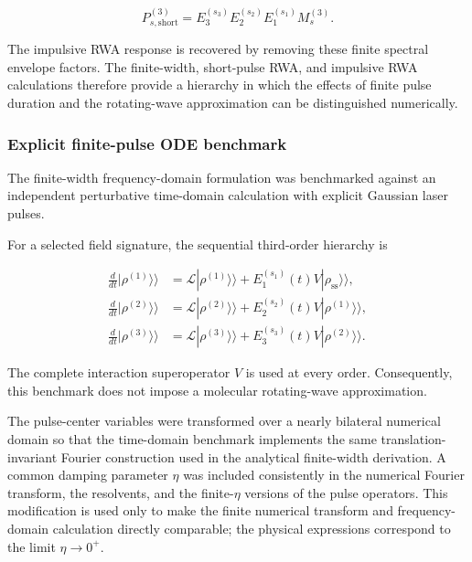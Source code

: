 \documentclass[11pt]{article}
\begin{document}
\begin{equation}
P_{s,\mathrm{short}}^{(3)}
=
E_3^{(s_3)}
E_2^{(s_2)}
E_1^{(s_1)}
M_s^{(3)}.
\label{eq:third_order_short_validation}
\end{equation}

The impulsive RWA response is recovered by removing these finite
spectral envelope factors.  The finite-width, short-pulse RWA, and
impulsive RWA calculations therefore provide a hierarchy in which the
effects of finite pulse duration and the rotating-wave approximation
can be distinguished numerically.


\subsubsection{Explicit finite-pulse ODE benchmark}

The finite-width frequency-domain formulation was benchmarked against
an independent perturbative time-domain calculation with explicit
Gaussian laser pulses.

For a selected field signature, the sequential third-order hierarchy is

\begin{align}
\frac{d}{dt}
|\rho^{(1)}\rangle\rangle
&=
\mathcal{L}
|\rho^{(1)}\rangle\rangle
+
E_1^{(s_1)}(t)
V
|\rho_{\mathrm{ss}}\rangle\rangle ,
\\
\frac{d}{dt}
|\rho^{(2)}\rangle\rangle
&=
\mathcal{L}
|\rho^{(2)}\rangle\rangle
+
E_2^{(s_2)}(t)
V
|\rho^{(1)}\rangle\rangle ,
\\
\frac{d}{dt}
|\rho^{(3)}\rangle\rangle
&=
\mathcal{L}
|\rho^{(3)}\rangle\rangle
+
E_3^{(s_3)}(t)
V
|\rho^{(2)}\rangle\rangle .
\label{eq:third_order_finite_ode}
\end{align}

The complete interaction superoperator $V$ is used at every order.
Consequently, this benchmark does not impose a molecular
rotating-wave approximation.

The pulse-center variables were transformed over a nearly bilateral
numerical domain so that the time-domain benchmark implements the same
translation-invariant Fourier construction used in the analytical
finite-width derivation.  A common damping parameter $\eta$ was
included consistently in the numerical Fourier transform, the
resolvents, and the finite-$\eta$ versions of the pulse operators.
This modification is used only to make the finite numerical transform
and frequency-domain calculation directly comparable; the physical
expressions correspond to the limit $\eta\rightarrow0^{+}$.
\end{document}
